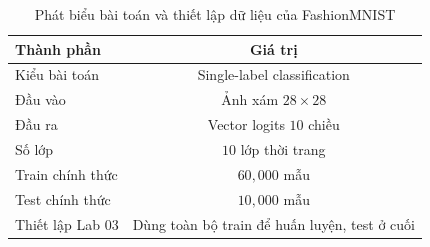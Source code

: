 \begin{table}[H]
\centering
\caption{Phát biểu bài toán và thiết lập dữ liệu của FashionMNIST}
\label{tab:fashion-mnist-problem-setup}
\begin{tabular}{l c}
\toprule
Thành phần & Giá trị \\
\midrule
Kiểu bài toán & Single-label classification \\
Đầu vào & Ảnh xám $28 \times 28$ \\
Đầu ra & Vector logits $10$ chiều \\
Số lớp & $10$ lớp thời trang \\
Train chính thức & $60{,}000$ mẫu \\
Test chính thức & $10{,}000$ mẫu \\
Thiết lập Lab 03 & Dùng toàn bộ train để huấn luyện, test ở cuối \\
\bottomrule
\end{tabular}
\end{table}
